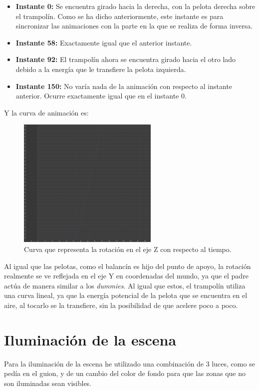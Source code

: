 \documentclass{article}
\begin{document}
\begin{itemize}
    \item \textbf{Instante 0: }Se encuentra girado hacia la derecha, con la pelota derecha sobre el trampolín. Como se ha dicho anteriormente, este instante es para sincronizar las animaciones con la parte en la que se realiza de forma inversa.
    \item \textbf{Instante 58: }Exactamente igual que el anterior instante.
    \item \textbf{Instante 92: }El trampolín ahora se encuentra girado hacia el otro lado debido a la energía que le transfiere la pelota izquierda.
    \item \textbf{Instante 150: }No varía nada de la animación con respecto al instante anterior. Ocurre exactamente igual que en el instante 0.
\end{itemize}

\bigskip

Y la curva de animación es:

\begin{figure}[H]
    \centering
    \includegraphics[width=0.6\textwidth]{imagenes/curvas/Trampolin/blue.png}
    \caption{Curva que representa la rotación en el eje Z con respecto al tiempo.}
 \end{figure}

 Al igual que las pelotas, como el balancín es hijo del punto de apoyo, la rotación realmente se ve reflejada en el eje Y en coordenadas del mundo, ya que el padre actúa de manera similar a los \textit{dummies}. Al igual que estos, el trampolín utiliza una curva lineal, ya que la energía potencial de la pelota que se encuentra en el aire, al tocarlo se la transfiere, sin la posibilidad de que acelere poco a poco.
\section{Iluminación de la escena}
Para la iluminación de la escena he utilizado una combinación de 3 luces, como se pedía en el guion, y de un cambio del color de fondo para que las zonas que no son iluminadas sean visibles.
\end{document}
